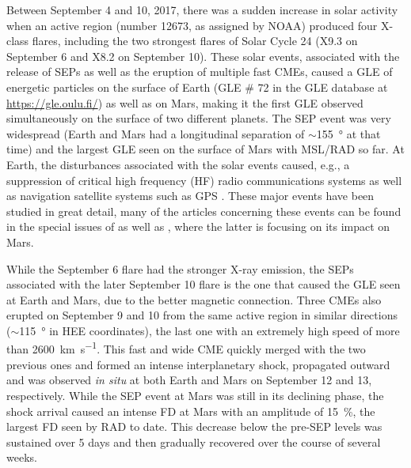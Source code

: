 Between September 4 and 10, 2017, there was a sudden increase in solar activity when an active region (number 12673, as assigned by NOAA) produced four X-class flares, including the two strongest flares of Solar Cycle 24 (X9.3 on September 6 and X8.2 on September 10).
These solar events, associated with the release of \acp{SEP} as well as the eruption of multiple fast \acp{CME}, caused a \ac{GLE} of energetic particles on the surface of Earth (\ac{GLE} \# 72 in the \ac{GLE} database at \url{https://gle.oulu.fi/}) as well as on Mars, making it the first \ac{GLE} observed simultaneously on the surface of two different planets.
The \ac{SEP} event was very widespread (Earth and Mars had a longitudinal separation of $\sim$\SI{155}{\degree} at that time) and the largest \ac{GLE} seen on the surface of Mars with \ac{MSL}/\ac{RAD} so far. At Earth, the disturbances associated with the solar events caused, e.g., a suppression of critical high frequency (HF) radio communications systems \citep{Frissell-2018,Bland-2018} as well as navigation satellite systems such as GPS \citep{Berdermann-2018,Sato-2019}.
These major events have been studied in great detail, many of the articles concerning these events can be found in the special issues of \citet{SpaceWeather-2018-special-issue-September-event} as well as \citet{GRL-2018-special-issue-September-event}, where the latter is focusing on its impact on Mars.

While the September 6 flare had the stronger X-ray emission, the \acp{SEP} associated with the later September 10 flare is the one that caused the \ac{GLE} seen at Earth and Mars, due to the better magnetic connection. Three CMEs also erupted on September 9 and 10 from the same active region in similar directions ($\sim$\SI{115}{\degree} in \ac{HEE} coordinates), the last one with an extremely high speed of more than \SI{2600}{\kilo\meter\per\second}. This fast and wide CME quickly merged with the two previous ones and formed an intense interplanetary shock, propagated outward and was observed \textit{in situ} at both Earth and Mars on September 12 and 13, respectively. While the \ac{SEP} event at Mars was still in its declining phase, the shock arrival caused an intense \ac{FD} at Mars with an amplitude of \SI{15}{\percent}, the largest \ac{FD} seen by \ac{RAD} to date. This decrease below the pre-\ac{SEP} levels was sustained over 5 days and then gradually recovered over the course of several weeks.

